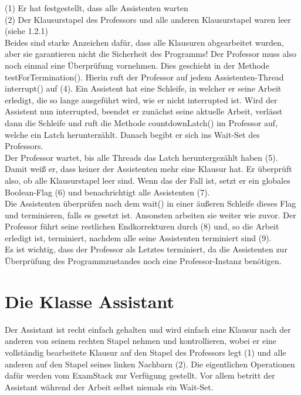 \documentclass[12pt,a4paper]{article}
\begin{document}
(1) Er hat festgestellt, dass alle Assistenten warten\\
(2) Der Klausurstapel des Professors und alle anderen Klausurstapel waren leer (siehe 1.2.1)\\

Beides sind starke Anzeichen dafür, dass alle Klausuren abgearbeitet wurden, aber sie garantieren nicht die Sicherheit des Programms! Der Professor muss also noch einmal eine Überprüfung vornehmen. Dies geschieht in der Methode testForTermination().
Hierin ruft der Professor auf jedem Assistenten-Thread interrupt() auf (4). Ein Assistent hat eine Schleife, in welcher er seine Arbeit erledigt, die so lange ausgeführt wird, wie er nicht interrupted ist. Wird der Assistent nun interrupted, beendet er zunächst seine aktuelle Arbeit, verlässt dann die Schleife und ruft die Methode countdownLatch() im Professor auf, welche ein Latch herunterzählt. Danach begibt er sich ins Wait-Set des Professors.\\
Der Professor wartet, bis alle Threads das Latch heruntergezählt haben (5). Damit weiß er, dass keiner der Assistenten mehr eine Klausur hat. Er überprüft also, ob alle Klausurstapel leer sind. Wenn das der Fall ist, setzt er ein globales Boolean-Flag (6) und benachrichtigt alle Assistenten (7).\\ Die Assistenten überprüfen nach dem wait() in einer äußeren Schleife dieses Flag und terminieren, falls es gesetzt ist. Ansonsten arbeiten sie weiter wie zuvor. Der Professor führt seine  restlichen Endkorrekturen durch (8) und, so die Arbeit erledigt ist, terminiert, nachdem alle seine Assistenten terminiert sind (9).\\ Es ist wichtig, dass der Professor als Letztes terminiert, da die Assistenten zur Überprüfung des Programmzustandes noch eine Professor-Instanz benötigen.

\newpage
\section{Die Klasse Assistant}

Der Assistant ist recht einfach gehalten und wird einfach eine Klausur nach der anderen von seinem rechten Stapel nehmen und kontrollieren, wobei er eine vollständig bearbeitete Klausur auf den Stapel des Professors legt (1) und alle anderen auf den Stapel seines linken Nachbarn (2). Die eigentlichen Operationen dafür werden vom ExamStack zur Verfügung gestellt. Vor allem betritt der Assistant während der Arbeit selbst niemals ein Wait-Set.
\end{document}
